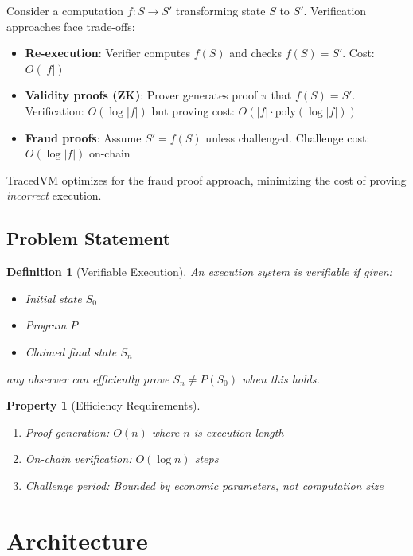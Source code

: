 \documentclass[11pt,a4paper]{article}
\newtheorem{definition}{Definition}
\newtheorem{property}{Property}
\begin{document}
Consider a computation $f: S \to S'$ transforming state $S$ to $S'$. Verification approaches face trade-offs:

\begin{itemize}
    \item \textbf{Re-execution}: Verifier computes $f(S)$ and checks $f(S) = S'$. Cost: $O(|f|)$
    \item \textbf{Validity proofs (ZK)}: Prover generates proof $\pi$ that $f(S) = S'$. Verification: $O(\log |f|)$ but proving cost: $O(|f| \cdot \text{poly}(\log |f|))$
    \item \textbf{Fraud proofs}: Assume $S' = f(S)$ unless challenged. Challenge cost: $O(\log |f|)$ on-chain
\end{itemize}

TracedVM optimizes for the fraud proof approach, minimizing the cost of proving \textit{incorrect} execution.

\subsection{Problem Statement}

\begin{definition}[Verifiable Execution]
An execution system is verifiable if given:
\begin{itemize}
    \item Initial state $S_0$
    \item Program $P$
    \item Claimed final state $S_n$
\end{itemize}
any observer can efficiently prove $S_n \neq P(S_0)$ when this holds.
\end{definition}

\begin{property}[Efficiency Requirements]
\begin{enumerate}
    \item Proof generation: $O(n)$ where $n$ is execution length
    \item On-chain verification: $O(\log n)$ steps
    \item Challenge period: Bounded by economic parameters, not computation size
\end{enumerate}
\end{property}

\section{Architecture}
\end{document}
